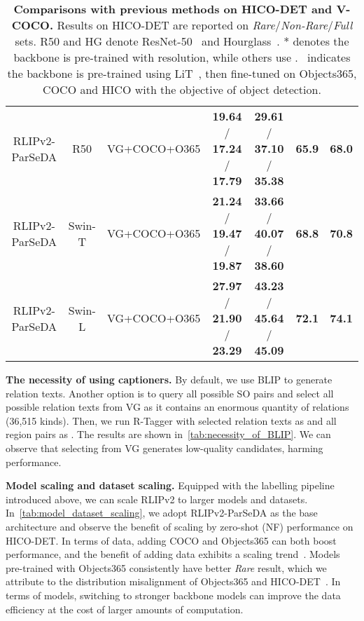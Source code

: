 {\begin{table*}[t]
\begin{tabular}{c|c|c|cc|cc}
    \rowcolor{mygray} RLIPv2-ParSeDA & R50   & VG+COCO+O365 & \textbf{19.64} / \textbf{17.24} / \textbf{17.79} & \textbf{29.61} / \textbf{37.10} / \textbf{35.38} &   \textbf{65.9}    & \textbf{68.0} \\
    \rowcolor{mygray} RLIPv2-ParSeDA & Swin-T & VG+COCO+O365 & \textbf{21.24} / \textbf{19.47} / \textbf{19.87} &  \textbf{33.66} / \textbf{40.07} / \textbf{38.60} &  \textbf{68.8}  &  \textbf{70.8} \\
    \rowcolor{mygray} RLIPv2-ParSeDA & Swin-L & VG+COCO+O365 &   \textbf{27.97} / \textbf{21.90} / \textbf{23.29}    &  \textbf{43.23} / \textbf{45.64} / \textbf{45.09}  &  \textbf{72.1}   & \textbf{74.1} \\
    \bottomrule
    \end{tabular}
    \vspace{-.1cm}
    \caption{\small \textbf{Comparisons with previous methods on HICO-DET and V-COCO.} Results on HICO-DET are reported on \textit{Rare}/\textit{Non-Rare}/\textit{Full} sets. R50 and HG denote ResNet-50~\cite{he2016resnet} and Hourglass~\cite{newell2016hourglass}. 
    * denotes the backbone is pre-trained with  resolution, while others use .
    \dag \ indicates the backbone is pre-trained using LiT~\cite{zhai2022LiT}, then fine-tuned on Objects365, COCO and HICO with the objective of object detection.}
    \vspace{-.2cm}
  \label{tab:SOTA_HOI}
\end{table*}}





\textbf{The necessity of using captioners.}
By default, we use BLIP to generate relation texts. Another option is to query all possible SO pairs and select all possible relation texts from VG as it contains an enormous quantity of relations (36,515 kinds).
Then, we run R-Tagger with selected relation texts as  and all region pairs as .
The results are shown in~\cref{tab:necessity_of_BLIP}.
We can observe that selecting from VG generates low-quality candidates, harming performance.





\textbf{Model scaling and dataset scaling.}
Equipped with the labelling pipeline introduced above, we can scale RLIPv2 to larger models and datasets.
In~\cref{tab:model_dataset_scaling}, we adopt RLIPv2-ParSeDA as the base architecture and observe the benefit of scaling by zero-shot (NF) performance on HICO-DET.
In terms of data, adding COCO and Objects365 can both boost performance, and the benefit of adding data exhibits a  scaling trend~\cite{cherti2022reproducible_scaling_law}.
Models pre-trained with Objects365 consistently have better \textit{Rare} result, which we attribute to the distribution misalignment of Objects365 and HICO-DET~\cite{entezari2023role_of_pre-training_data}.
In terms of models, switching to stronger backbone models can improve the data efficiency at the cost of larger amounts of computation.







